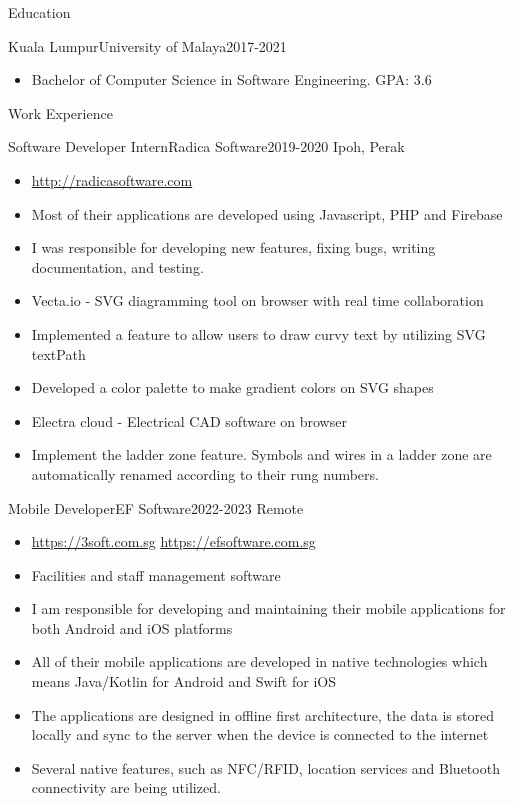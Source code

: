\documentclass[]{mcdowellcv}
\begin{document}
\makeheader


\begin{cvsection}{Education}
	\begin{cvsubsection}{Kuala Lumpur}{University of Malaya}{2017-2021}
		\begin{itemize}
			\item Bachelor of Computer Science in Software Engineering. GPA: 3.6
		\end{itemize}
	\end{cvsubsection}
\end{cvsection}
\begin{cvsection}{Work Experience}
	\begin{cvsubsection}{Software Developer Intern}{Radica Software}{2019-2020}
		Ipoh, Perak
		\begin{itemize}%
			\item \url{http://radicasoftware.com}
			\item Most of their applications are developed using Javascript, PHP and Firebase
			\item I was responsible for developing new features, fixing bugs, writing documentation, and testing.
			\item Vecta.io - SVG diagramming tool on browser with real time collaboration
			\item Implemented a feature to allow users to draw curvy text by utilizing SVG textPath
			\item Developed a color palette to make gradient colors on SVG shapes
			\item Electra cloud - Electrical CAD software on browser
			\item Implement the ladder zone feature. Symbols and wires in a ladder zone are automatically renamed according to their rung numbers.
		\end{itemize}
	\end{cvsubsection}
	\begin{cvsubsection}{Mobile Developer}{EF Software}{2022-2023}
		Remote
		\begin{itemize}%
			\item \url{https://3soft.com.sg} \quad\url{https://efsoftware.com.sg}
			\item Facilities and staff management software
			\item I am responsible for developing and maintaining their mobile applications for both Android and iOS platforms
			\item All of their mobile applications are developed in native technologies which means Java/Kotlin for Android and Swift for iOS
			\item The applications are designed in offline first architecture, the data is stored locally and sync to the server when the device is connected to the internet
			\item Several native features, such as NFC/RFID, location services and Bluetooth connectivity are being utilized.
		\end{itemize}
	\end{cvsubsection}
\end{cvsection}
\end{document}
